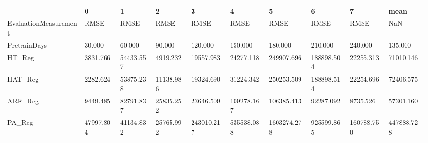 \begin{tabular}{llllllllll}
\toprule
{} &          0 &          1 &          2 &           3 &           4 &            5 &           6 &           7 &        mean \\
\midrule
EvaluationMeasurement &       RMSE &       RMSE &       RMSE &        RMSE &        RMSE &         RMSE &        RMSE &        RMSE &         NaN \\
PretrainDays          &     30.000 &     60.000 &     90.000 &     120.000 &     150.000 &      180.000 &     210.000 &     240.000 &     135.000 \\
HT\_Reg                &   3831.766 &  54433.557 &   4919.232 &   19557.983 &   24277.118 &   249907.696 &  188898.504 &   22255.313 &   71010.146 \\
HAT\_Reg               &   2282.624 &  53875.238 &  11138.986 &   19324.690 &   31224.342 &   250253.509 &  188898.514 &   22254.696 &   72406.575 \\
ARF\_Reg               &   9449.485 &  82791.837 &  25835.252 &   23646.509 &  109278.167 &   106385.413 &   92287.092 &    8735.526 &   57301.160 \\
PA\_Reg                &  47997.804 &  41134.832 &  25765.992 &  243010.217 &  535538.088 &  1603274.278 &  925599.865 &  160788.750 &  447888.728 \\
\bottomrule
\end{tabular}
